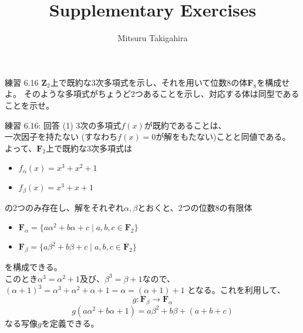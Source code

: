 \documentclass[dvipdfmx,10pt,jsarticle]{beamer}
\title{Supplementary Exercises}
\author{Mitsuru Takigahira}
\date[2017/10/01]{}
\begin{document}
  \frame{\maketitle}
 
  \begin{frame}{練習 6.16}
    $\mathbf{Z}_2$上で既約な3次多項式を示し、それを用いて位数8の体$\mathbf{F}_8$を構成せよ。
    そのような多項式がちょうど2つあることを示し、対応する体は同型であることを示せ。
  \end{frame}

  \begin{frame}{練習 6.16: 回答 (1)}
    3次の多項式$f(x)$が既約であることは、 \\一次因子を持たない (すなわち$f(x) = 0$が解をもたない)ことと同値である。 \\
    よって、$\mathbf{F}_2$上で既約な3次多項式は
    \begin{itemize}
      \item $f_\alpha (x) = x^3 + x^2 + 1$
      \item $f_\beta (x) = x^3 + x + 1$
    \end{itemize}
    の2つのみ存在し、解をそれぞれ$\alpha, \beta$とおくと、2つの位数8の有限体
    \begin{itemize}
      \item $\mathbf{F}_\alpha = \lbrace a \alpha^2 + b \alpha + c \mid a, b, c \in \mathbf{F}_2 \rbrace$
      \item $\mathbf{F}_\beta = \lbrace a \beta^2 + b \beta + c \mid a, b, c \in \mathbf{F}_2 \rbrace$
    \end{itemize}
    を構成できる。\\
    このとき$\alpha^3 = \alpha^2 + 1$及び、$\beta^3 = \beta + 1$なので、\\
    ${(\alpha + 1)}^3 = \alpha^3 + \alpha^2 + \alpha + 1 = \alpha = (\alpha + 1) + 1$ となる。これを利用して、
    \[ g: \mathbf{F}_\beta \rightarrow \mathbf{F}_\alpha \]
    \[g(a \alpha^2 + b \alpha + 1) = a \beta^2 + b \beta + (a + b + c) \]
    なる写像$g$を定義できる。 \\
  \end{frame}
\end{document}
